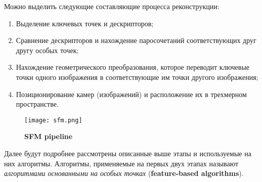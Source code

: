 \vspace{1mm}
Можно выделить следующие составляющие процесса реконструкции: 

\begin{enumerate}
    \item Выделение ключевых точек и дескрипторов;
    \item Сравнение дескрипторов и нахождение паросочетаний соответствующих друг другу особых точек;
    \item Нахождение геометрического преобразования, которое переводит ключевые точки одного изображения в соответствующие им точки другого изображения;
    \item Позиционирование камер (изображений) и расположение их в трехмерном пространстве.
\end{enumerate}

\begin{figure}[h]
    \centering
    \texttt{[image: sfm.png]}
    \caption{\textbf{SFM pipeline}}
    \label{fig:sfm}
\end{figure}

Далее будут подробнее рассмотрены описанные выше этапы и используемые на них алгоритмы. Алгоритмы, применяемые на первых двух этапах называют \textit{алгоритмами основанными на особых точках} (\textbf{feature-based algorithms}).
